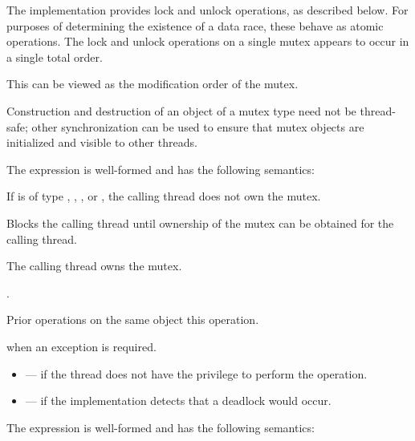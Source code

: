 \pnum
The implementation provides lock and unlock operations, as described below.
For purposes of determining the existence of a data race, these behave as
atomic operations. The lock and unlock operations on
a single mutex appears to occur in a single total order.
\begin{note}
This
can be viewed as the modification order of the
mutex.
\end{note}
\begin{note}
Construction and
destruction of an object of a mutex type need not be thread-safe; other
synchronization can be used to ensure that mutex objects are initialized
and visible to other threads.
\end{note}

\pnum
The expression  is well-formed and has the following semantics:

\begin{itemdescr}
\pnum
\expects
If  is of type , ,
, or , the calling
thread does not own the mutex.

\pnum
{}%
\effects
Blocks the calling thread until ownership of the mutex can be obtained for the calling thread.

\pnum
\ensures
The calling thread owns the mutex.

\pnum
\returntype {}.

\pnum
\sync
Prior  operations on the same object
 this operation.

\pnum
\throws
{} when
an exception is required.

\pnum
\errors
\begin{itemize}
\item {} --- if the thread does not have the
privilege to perform the operation.

\item {} --- if the implementation detects
that a deadlock would occur.
\end{itemize}
\end{itemdescr}

\pnum
The expression  is well-formed and has the following semantics:

